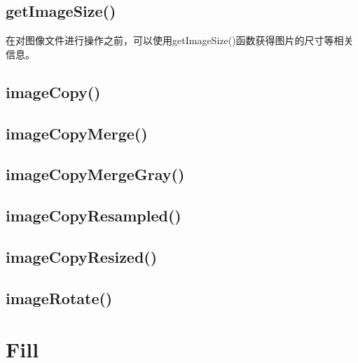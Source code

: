 \begin{lstlisting}[language=PHP]

\end{lstlisting}



\subsection{getImageSize()}


在对图像文件进行操作之前，可以使用getImageSize()函数获得图片的尺寸等相关信息。




\subsection{imageCopy()}





\subsection{imageCopyMerge()}



\subsection{imageCopyMergeGray()}



\subsection{imageCopyResampled()}




\subsection{imageCopyResized()}


\subsection{imageRotate()}







\section{Fill}




